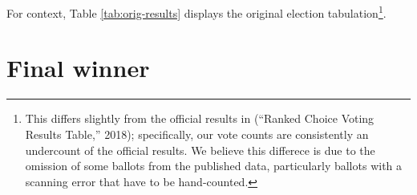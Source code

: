 \documentclass[12pt,twoside]{reedthesis}
\begin{document}
\begin{table}[t]

\caption[Election results - original]{\label{tab:orig-results}Original election results}
\centering
{}
\end{table}
For context, Table \ref{tab:orig-results} displays the original election tabulation\footnote{This differs slightly from the official results in (``Ranked Choice Voting Results Table,'' 2018); specifically, our vote counts are consistently an undercount of the official results. We believe this differece is due to the omission of some ballots from the published data, particularly ballots with a scanning error that have to be hand-counted.}.

\hypertarget{final-winner}{%
\section{Final winner}\label{final-winner}}
\end{document}
